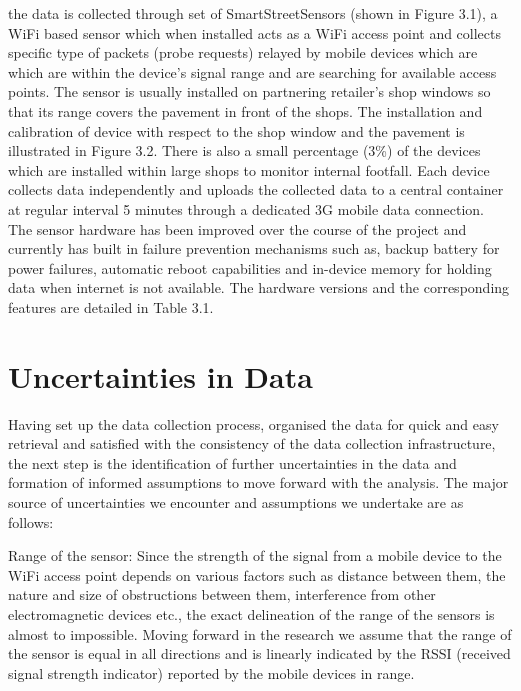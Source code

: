 the data is collected through set of SmartStreetSensors (shown in Figure 3.1), a WiFi based sensor which when installed acts as a WiFi access point and collects specific type of packets (probe requests) relayed by mobile devices which are which are within the device’s signal range and are searching for available access points. The sensor is usually installed on partnering retailer's shop windows so that its range covers the pavement in front of the shops. The installation and calibration of device with respect to the shop window and the pavement is illustrated in Figure 3.2. There is also a small percentage (3\%) of the devices which are installed within large shops to monitor internal footfall. Each device collects data independently and uploads the collected data to a central container at regular interval 5 minutes through a dedicated 3G mobile data connection. The sensor hardware has been improved over the course of the project and currently has built in failure prevention mechanisms such as, backup battery for power failures, automatic reboot capabilities and in-device memory for holding data when internet is not available. The hardware versions and the corresponding features are detailed in Table 3.1.

\section{Uncertainties in Data}

Having set up the data collection process, organised the data for quick and easy retrieval and satisfied with the consistency of the data collection infrastructure, the next step is the identification of further uncertainties in the data and formation of informed assumptions to move forward with the analysis. The major source of uncertainties we encounter and assumptions we undertake are as follows:

Range of the sensor: Since the strength of the signal from a mobile device to the WiFi access point depends on various factors such as distance between them, the nature and size of obstructions between them, interference from other electromagnetic devices etc., the exact delineation of the range of the sensors is almost to impossible. Moving forward in the research we assume that the range of the sensor is equal in all directions and is linearly indicated by the RSSI (received signal strength indicator) reported by the mobile devices in range.

